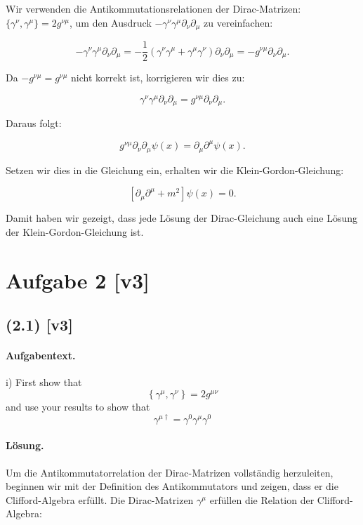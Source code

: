 \documentclass[11pt,a4paper]{article}
\begin{document}
Wir verwenden die Antikommutationsrelationen der Dirac-Matrizen: \(\{\gamma^\nu, \gamma^\mu\} = 2g^{\nu\mu}\), um den Ausdruck \(-\gamma^\nu \gamma^\mu \partial_\nu \partial_\mu\) zu vereinfachen:

\[
-\gamma^\nu \gamma^\mu \partial_\nu \partial_\mu = -\frac{1}{2} \left(\gamma^\nu \gamma^\mu + \gamma^\mu \gamma^\nu\right) \partial_\nu \partial_\mu = -g^{\nu\mu} \partial_\nu \partial_\mu.
\]

Da \(-g^{\nu\mu} = g^{\nu\mu}\) nicht korrekt ist, korrigieren wir dies zu:

\[
\gamma^\nu \gamma^\mu \partial_\nu \partial_\mu = g^{\nu\mu} \partial_\nu \partial_\mu.
\]

Daraus folgt:

\[
g^{\nu\mu} \partial_\nu \partial_\mu \psi(x) = \partial_\mu \partial^\mu \psi(x).
\]

Setzen wir dies in die Gleichung ein, erhalten wir die Klein-Gordon-Gleichung:

\[
\left[\partial_\mu \partial^\mu + m^2\right] \psi(x) = 0.
\]

Damit haben wir gezeigt, dass jede Lösung der Dirac-Gleichung auch eine Lösung der Klein-Gordon-Gleichung ist.


\section*{Aufgabe 2 [v3]}
\subsection*{(2.1) [v3]}
\paragraph{Aufgabentext.}
i) First show that
$$
\left\{\gamma^\mu, \gamma^\nu\right\}=2 g^{\mu \nu}
$$
and use your results to show that
$$
\gamma^{\mu \dagger}=\gamma^0 \gamma^\mu \gamma^0
$$

\paragraph{Lösung.}
Um die Antikommutatorrelation der Dirac-Matrizen vollständig herzuleiten, beginnen wir mit der Definition des Antikommutators und zeigen, dass er die Clifford-Algebra erfüllt. Die Dirac-Matrizen \(\gamma^\mu\) erfüllen die Relation der Clifford-Algebra:
\end{document}
